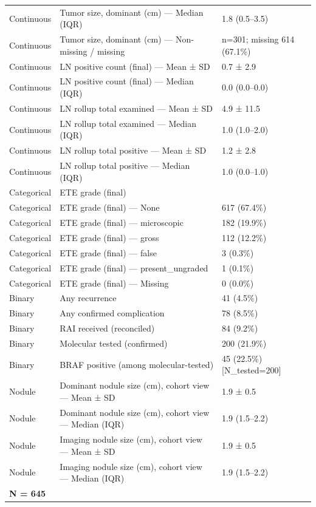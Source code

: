 \begin{table}[htbp]
\begin{tabular}{lll}
Continuous & Tumor size, dominant (cm) — Median (IQR) & 1.8 (0.5–3.5) \\
Continuous & Tumor size, dominant (cm) — Non-missing / missing & n=301; missing 614 (67.1\%) \\
Continuous & LN positive count (final) — Mean ± SD & 0.7 ± 2.9 \\
Continuous & LN positive count (final) — Median (IQR) & 0.0 (0.0–0.0) \\
Continuous & LN rollup total examined — Mean ± SD & 4.9 ± 11.5 \\
Continuous & LN rollup total examined — Median (IQR) & 1.0 (1.0–2.0) \\
Continuous & LN rollup total positive — Mean ± SD & 1.2 ± 2.8 \\
Continuous & LN rollup total positive — Median (IQR) & 1.0 (0.0–1.0) \\
Categorical & ETE grade (final) &  \\
Categorical & ETE grade (final) — None & 617 (67.4\%) \\
Categorical & ETE grade (final) — microscopic & 182 (19.9\%) \\
Categorical & ETE grade (final) — gross & 112 (12.2\%) \\
Categorical & ETE grade (final) — false & 3 (0.3\%) \\
Categorical & ETE grade (final) — present\_ungraded & 1 (0.1\%) \\
Categorical & ETE grade (final) — Missing & 0 (0.0\%) \\
Binary & Any recurrence & 41 (4.5\%) \\
Binary & Any confirmed complication & 78 (8.5\%) \\
Binary & RAI received (reconciled) & 84 (9.2\%) \\
Binary & Molecular tested (confirmed) & 200 (21.9\%) \\
Binary & BRAF positive (among molecular-tested) & 45 (22.5\%) [N\_tested=200] \\
Nodule & Dominant nodule size (cm), cohort view — Mean ± SD & 1.9 ± 0.5 \\
Nodule & Dominant nodule size (cm), cohort view — Median (IQR) & 1.9 (1.5–2.2) \\
Nodule & Imaging nodule size (cm), cohort view — Mean ± SD & 1.9 ± 0.5 \\
Nodule & Imaging nodule size (cm), cohort view — Median (IQR) & 1.9 (1.5–2.2) \\
\multicolumn{3}{l}{\textbf{N = 645}} \\

\end{tabular}
\end{table}
